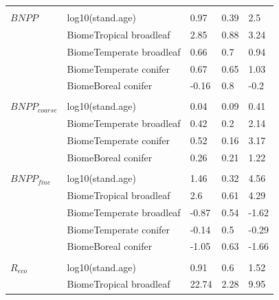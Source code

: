 \documentclass[
]{article}
\begin{document}
\begin{longtable}{lllll}
\addlinespace[1em]
\multicolumn{4}{l}{\textbf{}}\\
\hspace{1em}$BNPP$ & log10(stand.age) & 0.97 & 0.39 & 2.5\\
\hspace{1em} & BiomeTropical broadleaf & 2.85 & 0.88 & 3.24\\
\hspace{1em} & BiomeTemperate broadleaf & 0.66 & 0.7 & 0.94\\
\hspace{1em} & BiomeTemperate conifer & 0.67 & 0.65 & 1.03\\
\hspace{1em} & BiomeBoreal conifer & -0.16 & 0.8 & -0.2\\
\addlinespace[1em]
\multicolumn{4}{l}{\textbf{}}\\
\hspace{1em}$BNPP_{coarse}$ & log10(stand.age) & 0.04 & 0.09 & 0.41\\
\hspace{1em} & BiomeTemperate broadleaf & 0.42 & 0.2 & 2.14\\
\hspace{1em} & BiomeTemperate conifer & 0.52 & 0.16 & 3.17\\
\hspace{1em} & BiomeBoreal conifer & 0.26 & 0.21 & 1.22\\
\addlinespace[1em]
\multicolumn{4}{l}{\textbf{}}\\
\hspace{1em}$BNPP_{fine}$ & log10(stand.age) & 1.46 & 0.32 & 4.56\\
\hspace{1em} & BiomeTropical broadleaf & 2.6 & 0.61 & 4.29\\
\hspace{1em} & BiomeTemperate broadleaf & -0.87 & 0.54 & -1.62\\
\hspace{1em} & BiomeTemperate conifer & -0.14 & 0.5 & -0.29\\
\hspace{1em} & BiomeBoreal conifer & -1.05 & 0.63 & -1.66\\
\addlinespace[1em]
\multicolumn{4}{l}{\textbf{}}\\
\hspace{1em}$R_{eco}$ & log10(stand.age) & 0.91 & 0.6 & 1.52\\
\hspace{1em} & BiomeTropical broadleaf & 22.74 & 2.28 & 9.95\\

\end{longtable}
\end{document}
